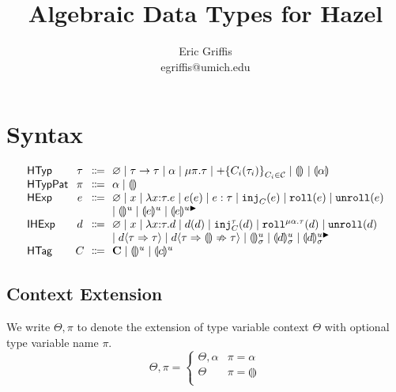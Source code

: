 \documentclass{article}
\title{Algebraic Data Types for Hazel}
\author{Eric Griffis \\ egriffis@umich.edu}
\date{}
\let\originalleft\left
\let\originalright\right
\renewcommand{\left}{\mathopen{}\mathclose\bgroup\originalleft}
\renewcommand{\right}{\aftergroup\egroup\originalright}
\newcommand\Sort[1]{\mathsf{#1}}
\newcommand\IHExp{\Sort{IHExp}}
\newcommand\HExp{\Sort{HExp}}
\newcommand\HTag{\Sort{HTag}}
\newcommand\HTyp{\Sort{HTyp}}
\newcommand\HTypPat{\Sort{HTypPat}}
\newcommand\hole[2][]{\llparenthesis#1\rrparenthesis^{#2}}
\newcommand\mhole[2][]{\llparenthesis#1\rrparenthesis^{#2 \blacktriangleright}}
\newcommand\dhole[3][]{\llparenthesis#1\rrparenthesis_{#2}^{#3}}
\newcommand\dmhole[3][]{\llparenthesis#1\rrparenthesis_{#2}^{#3 \blacktriangleright}}
\newcommand\Tarr[2]{#1 \rightarrow #2}
\newcommand\Trec[2]{\mu{#1}.{#2}}
\newcommand\Tsum[1]{+\mathopen{}\left\{#1\right\}}
\newcommand\Tag{\mathbf{C}}
\newcommand\TagSet{\mathcal{C}}
\newcommand\TagHole[2][]{\hole[#1]{#2}}
\newcommand\Unit{\varnothing}
\newcommand\literal[1]{\mathtt{#1}}
\newcommand\asc[2]{{#1}:{#2}}
\newcommand\Efun[3]{\lambda{#1}{:}{#2}.{#3}}
\newcommand\Eapp[2]{{#1}\left({#2}\right)}
\newcommand\Einj[2]{\literal{inj}_{#1}\left({#2}\right)}
\newcommand\Ecase[2]{\literal{case} \left({#1}\right) \left\{{#2}\right\}}
\newcommand\Eroll[1]{\literal{roll}\left(#1\right)}
\newcommand\Eunroll[1]{\literal{unroll}\left(#1\right)}
\newcommand\Dfun[3]{\lambda{#1}{:}{#2}.{#3}}
\newcommand\Dapp[2]{{#1}\left({#2}\right)}
\newcommand\Dinj[3]{\literal{inj}_{#1}^{#2}\left({#3}\right)}
\newcommand\Dcase[2]{\literal{case} \left({#1}\right) \left\{{#2}\right\}}
\newcommand\Droll[3]{\literal{roll}^{\Trec{#1}{#2}}\left({#3}\right)}
\newcommand\Dunroll[1]{\literal{unroll}\left(#1\right)}
\newcommand\cast[3]{{#1}\langle{#2}\Rightarrow{#3}\rangle}
\newcommand\failedcast[3]{{#1}\langle{#2}\Rightarrow{\llparenthesis\rrparenthesis}\nRightarrow{#3}\rangle}
\begin{document}
\maketitle


\section{Syntax}

\[
  \arraycolsep=0pt
  \begin{array}{l@{~~}c@{~~}c@{~~}l}
    \HTyp & \tau & \Coloneqq &
      \Unit
      \mid \Tarr{\tau}{\tau}
      \mid \alpha
      \mid \Trec{\pi}{\tau}
      \mid \Tsum{C_i(\tau_i)}_{C_i \in \TagSet}
      \mid \hole{}
      \mid \hole[\alpha]{}
      \\
    \HTypPat & \pi & \Coloneqq & \alpha \mid \hole{} \\
    \HExp & e & \Coloneqq &
      \Unit
      \mid x
      \mid \Efun{x}{\tau}{e}
      \mid \Eapp{e}{e}
      \mid \asc{e}{\tau}
      \mid \Einj{C}{e}
      \mid \Eroll{e}
      \mid \Eunroll{e}
      \\ & & &
      \mid \hole{u}
      \mid \hole[e]{u}
      \mid \mhole[e]{u}
      \\
    \IHExp & d & \Coloneqq &
      \Unit
      \mid x
      \mid \Dfun{x}{\tau}{d}
      \mid \Dapp{d}{d}
      \mid \Dinj{C}{\tau}{d}
      \mid \Droll{\alpha}{\tau}{d}
      \mid \Dunroll{d}
      \\ & & &
      \mid \cast{d}{\tau}{\tau}
      \mid \failedcast{d}{\tau}{\tau}
      \mid \dhole{\sigma}{u}
      \mid \dhole[d]{\sigma}{u}
      \mid \dmhole[d]{\sigma}{u}
      \\
    \HTag & C & \Coloneqq &
      \Tag
      \mid \TagHole{u}
      \mid \TagHole[c]{u}
      \\
  \end{array}
\]


\subsection{Context Extension}

We write $\Theta, \pi$ to denote the extension of type variable context $\Theta$ with optional type variable name $\pi$.
\[
  \Theta, \pi = \begin{cases}
    \Theta, \alpha & \pi = \alpha \\
    \Theta & \pi = \hole{} \\
  \end{cases}
\]
\end{document}
